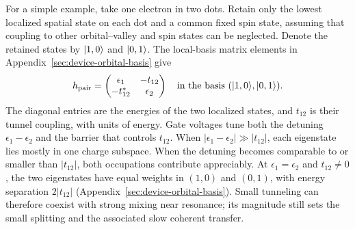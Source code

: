 For a simple example, take one electron in two dots. Retain only
the lowest localized spatial state on each dot and a common fixed
spin state, assuming that coupling to other orbital--valley and spin
states can be neglected. Denote the retained states by
$\lvert 1,0\rangle$ and $\lvert 0,1\rangle$. The local-basis matrix elements in
Appendix~\ref{sec:device-orbital-basis} give
\begin{equation}
 h_{\mathrm{pair}}=
 \begin{pmatrix}
  \epsilon_1&-t_{12}\\
  -t_{12}^*&\epsilon_2
 \end{pmatrix}
 \quad\text{in the basis }(\ket{1,0},\ket{0,1}).
 \label{eq:dot-pair-hamiltonian}
\end{equation}
The diagonal entries are the energies of the two localized states,
and $t_{12}$ is their tunnel coupling, with units of energy. Gate
voltages tune both the detuning $\epsilon_1-\epsilon_2$ and the
barrier that controls $t_{12}$.
When $|\epsilon_1-\epsilon_2|\gg|t_{12}|$, each eigenstate lies
mostly in one charge subspace. When the detuning becomes comparable
to or smaller than $|t_{12}|$, both occupations contribute
appreciably. At $\epsilon_1=\epsilon_2$ and $t_{12}\ne0$, the two
eigenstates have equal weights in $(1,0)$ and $(0,1)$, with energy
separation $2|t_{12}|$ (Appendix~\ref{sec:device-orbital-basis}).
Small tunneling can therefore coexist with strong mixing near
resonance; its magnitude still sets the small splitting and the
associated slow coherent transfer.

